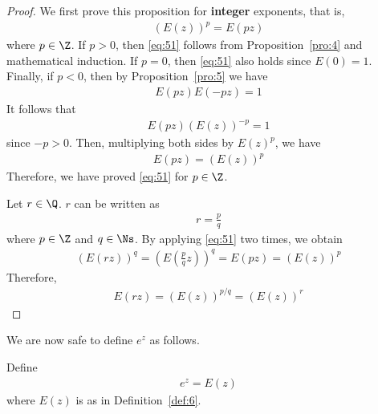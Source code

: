 \documentclass[thmcnt=section, 12pt]{elegantbook}
\begin{document}
\begin{proof}
    We first prove this proposition for \textbf{integer} exponents, that is,
    \begin{align}
        (E(z))^p = E(p z)
        \label{eq:51}
    \end{align}
    where $p \in \Z$. If $p > 0$, then \eqref{eq:51} follows from Proposition~\ref{pro:4} and mathematical induction. If $p = 0$, then \eqref{eq:51} also holds since $E(0) = 1$. Finally, if $p < 0$, then by Proposition~\ref{pro:5} we have 
    \begin{align*}
        E(p z) E(-p z) = 1
    \end{align*}
    It follows that 
    \begin{align*}
        E(p z) (E(z))^{-p} = 1
    \end{align*}
    since $-p > 0$. Then, multiplying both sides by $E(z)^p$, we have 
    \begin{align*}
        E(p z) = (E(z))^p
    \end{align*}
    Therefore, we have proved \eqref{eq:51} for $p \in \Z$.

    \par Let $r \in \Q$. $r$ can be written as 
    \begin{align*}
        r = \frac{p}{q}
    \end{align*}
    where $p \in \Z$ and $q \in \Ns$. By applying \eqref{eq:51} two times, we obtain
    \begin{align*}
        (E(r z))^q = (E(\frac{p}{q} z))^q
        = E(p z)
        = (E(z))^p
    \end{align*}
    Therefore,
    \begin{align*}
        E(r z) = (E(z))^{p/q} = (E(z))^r
    \end{align*}
\end{proof}


\par We are now safe to define $e^z$ as follows.

\begin{definition}
    Define 
    \begin{align*}
        e^z = E(z)
    \end{align*}
    where $E(z)$ is as in Definition~\ref{def:6}.
\end{definition}

\end{document}
